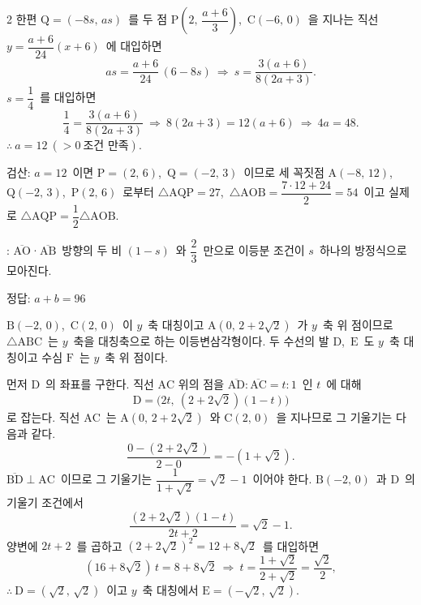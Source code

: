 \documentclass[10pt,fleqn]{article}   %
\begin{document}
\begin{multicols*}{2}
한편 $\mathrm{Q}=(-8s,\,as)$\ 를 두 점 $\mathrm{P}\!\left(2,\,\dfrac{a+6}{3}\right)$,\ $\mathrm{C}(-6,\,0)$\ 을 지나는 직선 $y=\dfrac{a+6}{24}(x+6)$\ 에 대입하면
\[ as = \dfrac{a+6}{24}\,(6-8s)\ \Longrightarrow\ s = \dfrac{3(a+6)}{8(2a+3)}. \]
$s=\dfrac{1}{4}$\ 를 대입하면
\[ \dfrac{1}{4} = \dfrac{3(a+6)}{8(2a+3)}\ \Longrightarrow\ 8(2a+3) = 12(a+6)\ \Longrightarrow\ 4a=48. \]
$\therefore\ a=12\ (>0\ \text{조건 만족})$.

검산: $a=12$\ 이면 $\mathrm{P}=(2,\,6)$,\ $\mathrm{Q}=(-2,\,3)$\ 이므로 세 꼭짓점 $\mathrm{A}(-8,\,12)$,\ $\mathrm{Q}(-2,\,3)$,\ $\mathrm{P}(2,\,6)$\ 로부터 $\triangle\mathrm{AQP}=27$,\ $\triangle\mathrm{AOB}=\dfrac{7\cdot 12+24}{2}=54$\ 이고 실제로 $\triangle\mathrm{AQP}=\dfrac{1}{2}\triangle\mathrm{AOB}$.

\begin{dmcriticalpoint}
: $\overline{\mathrm{AO}}$·$\overline{\mathrm{AB}}$\ 방향의 두 비 $(1-s)$\ 와 $\dfrac{2}{3}$\ 만으로 이등분 조건이 $s$\ 하나의 방정식으로 모아진다.
\end{dmcriticalpoint}

\begin{dmanswerbox}
정답: $a+b=96$
\end{dmanswerbox}

$\mathrm{B}(-2,\,0)$,\ $\mathrm{C}(2,\,0)$\ 이 $y$\ 축 대칭이고 $\mathrm{A}(0,\,2+2\sqrt{2})$\ 가 $y$\ 축 위 점이므로 $\triangle\mathrm{ABC}$\ 는 $y$\ 축을 대칭축으로 하는 이등변삼각형이다. 두 수선의 발 $\mathrm{D}$,\ $\mathrm{E}$\ 도 $y$\ 축 대칭이고 수심 $\mathrm{F}$\ 는 $y$\ 축 위 점이다.

먼저 $\mathrm{D}$\ 의 좌표를 구한다. 직선 $\mathrm{AC}$ 위의 점을 $\overline{\mathrm{AD}}:\overline{\mathrm{AC}}=t:1$\ 인 $t$\ 에 대해
\[ \mathrm{D} = \bigl(2t,\ (2 + 2\sqrt{2})(1 - t)\bigr) \]
로 잡는다. 직선 $\mathrm{AC}$\ 는 $\mathrm{A}(0,\,2+2\sqrt{2})$\ 와 $\mathrm{C}(2,\,0)$\ 을 지나므로 그 기울기는 다음과 같다.
\[ \dfrac{0-(2+2\sqrt{2})}{2-0}=-(1+\sqrt{2}). \]
$\overline{\mathrm{BD}}\perp\mathrm{AC}$\ 이므로 그 기울기는 $\dfrac{1}{1+\sqrt{2}}=\sqrt{2}-1$\ 이어야 한다. $\mathrm{B}(-2,\,0)$\ 과 $\mathrm{D}$\ 의 기울기 조건에서
\[ \dfrac{(2+2\sqrt{2})(1-t)}{2t+2} = \sqrt{2}-1. \]
양변에 $2t+2$\ 를 곱하고 $(2+2\sqrt{2})^2=12+8\sqrt{2}$\ 를 대입하면
\[ (16+8\sqrt{2})\,t = 8+8\sqrt{2}\ \Longrightarrow\ t = \dfrac{1+\sqrt{2}}{2+\sqrt{2}} = \dfrac{\sqrt{2}}{2}, \]
$\therefore\ \mathrm{D}=(\sqrt{2},\,\sqrt{2})$\ 이고 $y$\ 축 대칭에서 $\mathrm{E}=(-\sqrt{2},\,\sqrt{2})$.


\end{multicols*}
\end{document}
